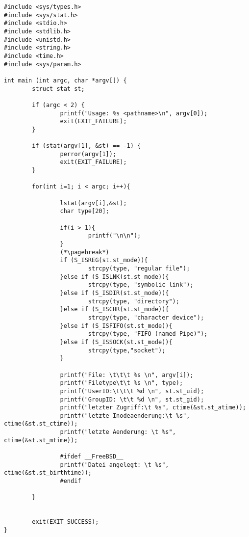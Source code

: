 \documentclass[11pt,a4paper,ngerman]{article}
\begin{document}
\begin{lstlisting}
#include <sys/types.h>
#include <sys/stat.h>
#include <stdio.h>
#include <stdlib.h>
#include <unistd.h>
#include <string.h>
#include <time.h>
#include <sys/param.h>

int main (int argc, char *argv[]) {
        struct stat st;

        if (argc < 2) {
                printf("Usage: %s <pathname>\n", argv[0]);
                exit(EXIT_FAILURE);
        }

        if (stat(argv[1], &st) == -1) {
                perror(argv[1]);
                exit(EXIT_FAILURE);
        }

        for(int i=1; i < argc; i++){

                lstat(argv[i],&st);
                char type[20];

                if(i > 1){
                        printf("\n\n");
                }                                                                                     
                (*\pagebreak*)                              
                if (S_ISREG(st.st_mode)){                                                             
                        strcpy(type, "regular file");                                                 
                }else if (S_ISLNK(st.st_mode)){                                                       
                        strcpy(type, "symbolic link");                                                
                }else if (S_ISDIR(st.st_mode)){
                        strcpy(type, "directory");
                }else if (S_ISCHR(st.st_mode)){
                        strcpy(type, "character device");
                }else if (S_ISFIFO(st.st_mode)){
                        strcpy(type, "FIFO (named Pipe)");
                }else if (S_ISSOCK(st.st_mode)){
                        strcpy(type,"socket");
                }

                printf("File: \t\t\t %s \n", argv[i]);
                printf("Filetype\t\t %s \n", type);
                printf("UserID:\t\t\t %d \n", st.st_uid);
                printf("GroupID: \t\t %d \n", st.st_gid);
                printf("letzter Zugriff:\t %s", ctime(&st.st_atime));
                printf("letzte Inodeaenderung:\t %s", ctime(&st.st_ctime));
                printf("letzte Aenderung: \t %s", ctime(&st.st_mtime));

                #ifdef __FreeBSD__
                printf("Datei angelegt: \t %s", ctime(&st.st_birthtime));
                #endif

        }


        exit(EXIT_SUCCESS);
}


\end{lstlisting}
\end{document}
